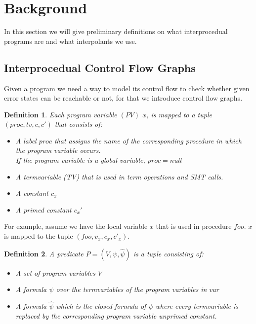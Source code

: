 \documentclass{article}
\newtheorem{mydef}{Definition}
\begin{document}
	\section{Background}
	In this section we will give preliminary definitions on what interprocedual programs are and what interpolants we use.
	
    
    \newcommand{\tf}{\ensuremath{\varphi}\xspace}
    \newcommand{\ctf}{\ensuremath{\hat{\varphi}}\xspace}
    \newcommand{\invars}{\ensuremath{In}\xspace}
    \newcommand{\outvars}{\ensuremath{Out}\xspace}
    \newcommand{\auxvars}{\ensuremath{Aux}\xspace}
	
	\subsection{Interprocedual Control Flow Graphs}	
	Given a program we need a way to model its control flow to check whether given error states can be reachable or not, for that we introduce control flow graphs.
	
	\begin{mydef}
	Each program variable $(PV)$ $x$, is mapped to a tuple $(proc, tv, c, c')$ that consists of: 
		\begin{itemize}
			\item A label $proc$ that assigns the name of the corresponding procedure in which the program variable occurs. \\
			If the program variable is a global variable, $proc = null$
			\item A termvariable (TV) that is used in term operations and SMT calls.
			\item A constant $c_x$
			\item A primed constant $c_x'$
		\end{itemize}
	\end{mydef}
	For example, assume we have the local variable $x$ that is used in procedure $foo$. $x$ is mapped to the tuple $(foo, v_x, c_x, c'_x)$.
	
	\begin{mydef}
		A predicate $P = (V, \psi, \hat{\psi})$ is a tuple consisting of: 
		\begin{itemize}
			\item A set of program variables $V$
			\item A formula $\psi$ over the termvariables of the program variables in $var$
			\item A formula $\hat{\psi}$ which is the closed formula of $\psi$ where every termvariable is replaced by the corresponding program variable unprimed constant.
		\end{itemize}
	\end{mydef}
	
\end{document}
